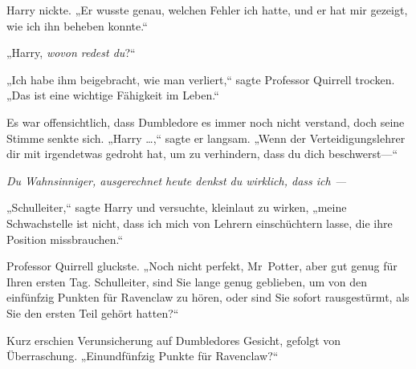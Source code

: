 Harry nickte. „Er wusste genau, welchen Fehler ich hatte, und er hat mir gezeigt, wie ich ihn beheben konnte.“

„Harry, \emph{wovon redest du}?“

„Ich habe ihm beigebracht, wie man verliert,“ sagte Professor Quirrell trocken. „Das ist eine wichtige Fähigkeit im Leben.“

Es war offensichtlich, dass Dumbledore es immer noch nicht verstand, doch seine Stimme senkte sich. „Harry …,“ sagte er langsam. „Wenn der Verteidigungslehrer dir mit irgendetwas gedroht hat, um zu verhindern, dass du dich beschwerst—“

\emph{Du Wahnsinniger, ausgerechnet heute denkst du wirklich, dass ich —}

„Schulleiter,“ sagte Harry und versuchte, kleinlaut zu wirken, „meine Schwachstelle ist nicht, dass ich mich von Lehrern einschüchtern lasse, die ihre Position missbrauchen.“

Professor Quirrell gluckste. „Noch nicht perfekt, Mr~Potter, aber gut genug für Ihren ersten Tag. Schulleiter, sind Sie lange genug geblieben, um von den einfünfzig Punkten für Ravenclaw zu hören, oder sind Sie sofort rausgestürmt, als Sie den ersten Teil gehört hatten?“

Kurz erschien Verunsicherung auf Dumbledores Gesicht, gefolgt von Überraschung. „Einundfünfzig Punkte für Ravenclaw?“

